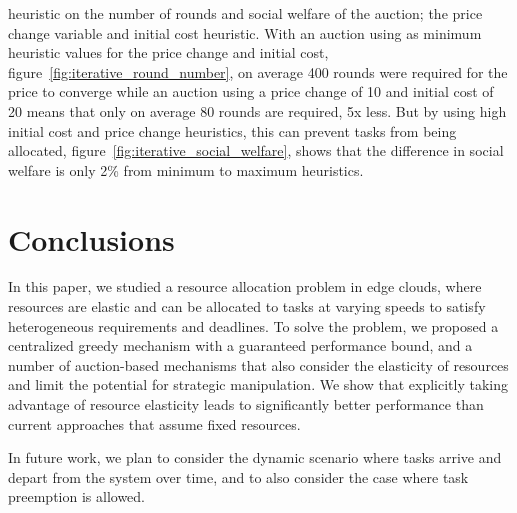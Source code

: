 heuristic on the number of rounds and social welfare of the auction; the price change variable and initial cost
heuristic. With an auction using as minimum heuristic values for the price change and initial cost,
figure~\ref{fig:iterative_round_number}, on average 400 rounds were required for the price to converge while an auction
using a price change of 10 and initial cost of 20 means that only on average 80 rounds are required, 5x less. But by
using high initial cost and price change heuristics, this can prevent tasks from being allocated,
figure~\ref{fig:iterative_social_welfare}, shows that the difference in social welfare is only 2\% from minimum to
maximum heuristics.



\section{Conclusions}\label{sec:conclusions-and-future-work}
In this paper, we studied a resource allocation problem in edge clouds, where resources are elastic and can be
allocated to tasks at varying speeds to satisfy heterogeneous requirements and deadlines. To solve the problem,
we proposed a centralized greedy mechanism with a guaranteed performance bound, and a number of auction-based
mechanisms that also consider the elasticity of resources and limit the potential for strategic manipulation. We show
that explicitly taking advantage of resource elasticity leads to significantly better performance than current
approaches that assume fixed resources.

In future work, we plan to consider the dynamic scenario where tasks arrive and depart from the system over time, and
to also consider the case where task preemption is allowed.